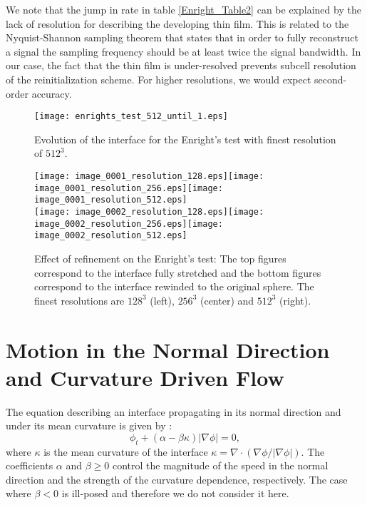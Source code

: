 \documentclass[english]{article}
\begin{document}
We note that the jump in rate in table \ref{Enright_Table2} can be explained by the lack of
resolution for describing the developing thin film. This is related to the Nyquist-Shannon sampling
theorem that states that in order to fully reconstruct a signal the sampling frequency should be at
least twice the signal bandwidth. In our case, the fact that the thin film is under-resolved
prevents subcell resolution of the reinitialization scheme. For higher resolutions, we would expect
second-order accuracy.

\begin{figure}
\begin{center}
\texttt{[image: enrights\_test\_512\_until\_1.eps]}
\end{center}
\caption{Evolution of the interface for the Enright's test with finest resolution of $512^3$.}
\label{fig_enrights_test_until_one}
\end{figure}

\begin{figure}
\begin{center}
\texttt{[image: image\_0001\_resolution\_128.eps]}\texttt{[image: image\_0001\_resolution\_256.eps]}\texttt{[image: image\_0001\_resolution\_512.eps]}\\
\texttt{[image: image\_0002\_resolution\_128.eps]}\texttt{[image: image\_0002\_resolution\_256.eps]}\texttt{[image: image\_0002\_resolution\_512.eps]}\\
\end{center}
\caption{Effect of refinement on the Enright's test: The top figures correspond to the interface
fully stretched and the bottom figures correspond to the interface rewinded to the original sphere.
The finest resolutions are $128^3$ (left), $256^3$ (center) and $512^3$ (right).}
\label{fig_enrights_test_refinement}
\end{figure}

%
%
\section{Motion in the Normal Direction and Curvature Driven Flow}
The equation describing an interface propagating in its normal direction and under its mean
curvature is given by \cite{osher:1988:originallevelset}:
\begin{equation}
\phi_t+(\alpha-\beta\kappa)|\nabla\phi|=0, \label{Motion_Normal_Curvature}
\end{equation}
where $\kappa$ is the mean curvature of the interface $\kappa=\nabla\cdot\left(
\nabla\phi/|\nabla\phi| \right)$. The coefficients $\alpha$ and $\beta\ge0$ control the magnitude
of the speed in the normal direction and the strength of the curvature dependence, respectively.
The case where $\beta<0$ is ill-posed and therefore we do not consider it here.
\end{document}
